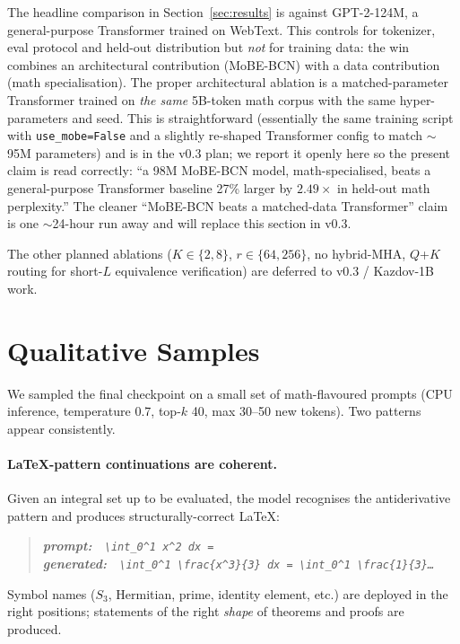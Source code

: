 \documentclass[11pt]{article}
\begin{document}
The headline comparison in Section~\ref{sec:results} is against
GPT-2-124M, a general-purpose Transformer trained on WebText.  This
controls for tokenizer, eval protocol and held-out distribution but
\emph{not} for training data: the win combines an architectural
contribution (MoBE-BCN) with a data contribution (math specialisation).
The proper architectural ablation is a matched-parameter Transformer
trained on \emph{the same} 5B-token math corpus with the same
hyper-parameters and seed.  This is straightforward (essentially the
same training script with \texttt{use\_mobe=False} and a slightly
re-shaped Transformer config to match $\sim$95M parameters) and is in
the v0.3 plan; we report it openly here so the present claim is read
correctly: ``a 98M MoBE-BCN model, math-specialised, beats a
general-purpose Transformer baseline 27\% larger by $2.49\times$ in
held-out math perplexity.''  The cleaner ``MoBE-BCN beats a
matched-data Transformer'' claim is one $\sim$24-hour run away and
will replace this section in v0.3.

The other planned ablations ($K \in \{2, 8\}$, $r \in \{64, 256\}$,
no hybrid-MHA, $Q$+$K$ routing for short-$L$ equivalence
verification) are deferred to v0.3 / Kazdov-1B work.

\section{Qualitative Samples}
\label{sec:samples}

We sampled the final checkpoint on a small set of math-flavoured
prompts (CPU inference, temperature 0.7, top-$k$ 40, max 30--50 new
tokens).  Two patterns appear consistently.

\paragraph{LaTeX-pattern continuations are coherent.}
Given an integral set up to be evaluated, the model recognises the
antiderivative pattern and produces structurally-correct LaTeX:
\begin{quote}\itshape
\textbf{prompt:}~~\texttt{\textbackslash int\_0\^{}1 x\^{}2 dx =}\\
\textbf{generated:}~~\texttt{\textbackslash int\_0\^{}1
\textbackslash frac\{x\^{}3\}\{3\} dx = \textbackslash int\_0\^{}1
\textbackslash frac\{1\}\{3\}\ldots}
\end{quote}
Symbol names ($S_3$, Hermitian, prime, identity element, etc.) are
deployed in the right positions; statements of the right
\emph{shape} of theorems and proofs are produced.
\end{document}
